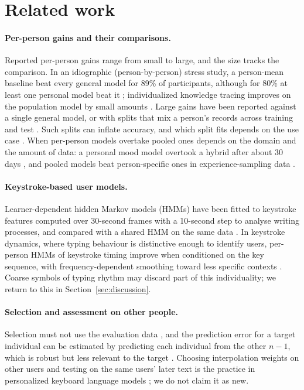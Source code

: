 \documentclass[pdflatex,sn-basic]{sn-jnl}
\begin{document}
\section{Related work}\label{sec:related}

\paragraph{Per-person gains and their comparisons.}
Reported per-person gains range from small to large, and the size tracks the comparison. In an idiographic (person-by-person) stress study, a person-mean baseline beat every general model for 89\% of participants, although for 80\% at least one personal model beat it \citep{Aalbers2023}; individualized knowledge tracing improves on the population model by small amounts \citep{Yudelson2013,Khajah2016}. Large gains have been reported against a single general model, or with splits that mix a person's records across training and test \citep{Weiss2012,Taylor2020,Meegahapola2022}. Such splits can inflate accuracy, and which split fits depends on the use case \citep{Saeb2017,Little2017}. When per-person models overtake pooled ones depends on the domain and the amount of data: a personal mood model overtook a hybrid after about 30 days \citep{LiKamWa2013}, and pooled models beat person-specific ones in experience-sampling data \citep{Leenaerts2024}.

\paragraph{Keystroke-based user models.}
Learner-dependent hidden Markov models (HMMs) have been fitted to keystroke features computed over 30-second frames with a 10-second step to analyse writing processes, and compared with a shared HMM on the same data \citep{Uto2020}.
In keystroke dynamics, where typing behaviour is distinctive enough to identify users, per-person HMMs of keystroke timing improve when conditioned on the key sequence, with frequency-dependent smoothing toward less specific contexts \citep{Monaco2018}. Coarse symbols of typing rhythm may discard part of this individuality; we return to this in Section~\ref{sec:discussion}.

\paragraph{Selection and assessment on other people.}
Selection must not use the evaluation data \citep{Cawley2010,Varma2006}, and the prediction error for a target individual can be estimated by predicting each individual from the other $n-1$, which is robust but less relevant to the target \citep{LiuMeng2016}. Choosing interpolation weights on other users and testing on the same users' later text is the practice in personalized keyboard language models \citep{Fowler2015,Shao2020,Adhikary2023}; we do not claim it as new.
\end{document}
